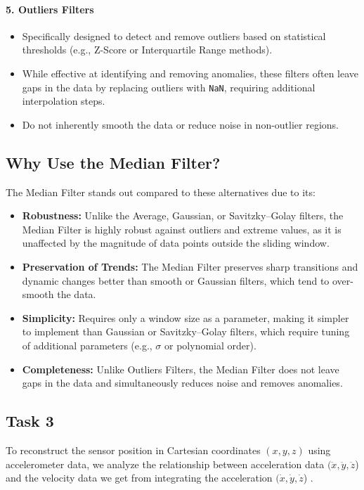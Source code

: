 \documentclass[12pt]{article}
\begin{document}
\paragraph{5. Outliers Filters}
\begin{itemize}
    \item Specifically designed to detect and remove outliers based on statistical thresholds (e.g., Z-Score or Interquartile Range methods).
    \item While effective at identifying and removing anomalies, these filters often leave gaps in the data by replacing outliers with \texttt{NaN}, requiring additional interpolation steps.
    \item Do not inherently smooth the data or reduce noise in non-outlier regions.
\end{itemize}

\subsection*{Why Use the Median Filter?}
The Median Filter stands out compared to these alternatives due to its:
\begin{itemize}
    \item \textbf{Robustness:} Unlike the Average, Gaussian, or Savitzky–Golay filters, the Median Filter is highly robust against outliers and extreme values, as it is unaffected by the magnitude of data points outside the sliding window.
    \item \textbf{Preservation of Trends:} The Median Filter preserves sharp transitions and dynamic changes better than smooth or Gaussian filters, which tend to over-smooth the data.
    \item \textbf{Simplicity:} Requires only a window size as a parameter, making it simpler to implement than Gaussian or Savitzky–Golay filters, which require tuning of additional parameters (e.g., \(\sigma\) or polynomial order).
    \item \textbf{Completeness:} Unlike Outliers Filters, the Median Filter does not leave gaps in the data and simultaneously reduces noise and removes anomalies.
\end{itemize}


\subsection{Task 3}


To reconstruct the sensor position in Cartesian coordinates  \(({x}, {y}, {z})\) using accelerometer data, we analyze the relationship between acceleration data \((\ddot{x}, \ddot{y}, \ddot{z}\)) and the velocity data we get from integrating the acceleration \((\dot{x}, \dot{y}, \dot{z}\)) . 
\end{document}
